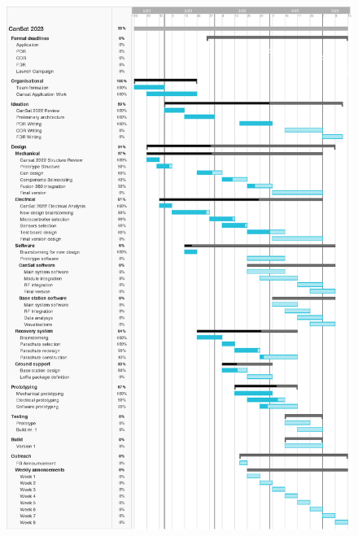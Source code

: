 \documentclass[11pt]{article}
\begin{document}
\begin{figure}[h]
    \centering
    \includegraphics[width=11.7cm]{images/Gantt.eps}
    \label{fig:gantt}
\end{figure}

\end{document}
